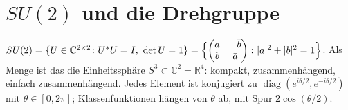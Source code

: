 \section{$SU(2)$ und die Drehgruppe}

\begin{definition}
$SU(2) = \{U\in\mathbb C^{2\times2}\colon U^{*}U = I,\ \det U = 1\} = \Bigl\{\begin{pmatrix}a & -\bar b\\ b & \bar a\end{pmatrix}\colon|a|^{2} + |b|^{2} = 1\Bigr\}$. Als Menge ist das die Einheitssphäre $S^{3}\subset\mathbb C^{2} = \mathbb R^{4}$: kompakt, zusammenhängend, einfach zusammenhängend. Jedes Element ist konjugiert zu $\operatorname{diag}(e^{i\theta/2}, e^{-i\theta/2})$ mit $\theta\in[0, 2\pi]$; Klassenfunktionen hängen von $\theta$ ab, mit Spur $2\cos(\theta/2)$.
\end{definition}


